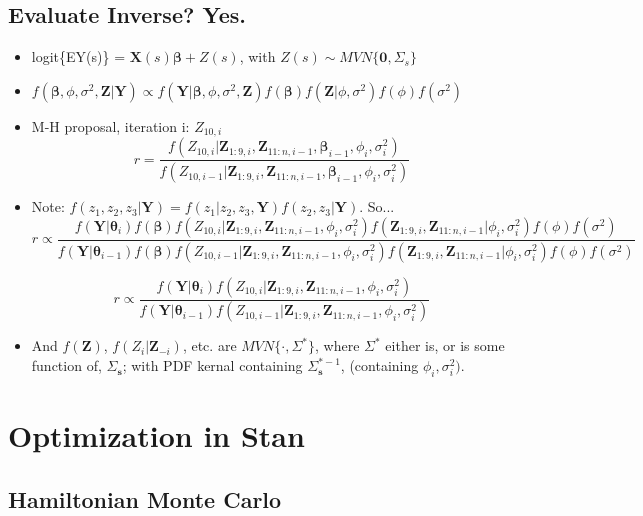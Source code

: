 \subsection{Evaluate Inverse? Yes.}


\begin{itemize}
\item logit\{EY(s)\} = $\pmb{X}(s)\pmb{\beta} + Z(s)$, with $Z(s) \sim MVN\{\pmb{0}, \Sigma_{s}\}$
\item $f(\pmb{\beta}, \phi, \sigma^{2}, \pmb{Z}|\pmb{Y}) \propto f(\pmb{Y}|\pmb{\beta}, \phi, \sigma^{2}, \pmb{Z})f(\pmb{\beta})f(\pmb{Z}|\phi, \sigma^{2})f(\phi)f(\sigma^{2})$
\item M-H proposal, iteration i: $Z_{10,i}$
$$ r = \frac{ f(Z_{10,i}|\pmb{Z}_{1:9,i},\pmb{Z}_{11:n,i-1}, \pmb{\beta}_{i-1}, \phi_{i}, \sigma^{2}_{i})}{f(Z_{10,i-1}|\pmb{Z}_{1:9,i},\pmb{Z}_{11:n,i-1}, \pmb{\beta}_{i-1}, \phi_{i}, \sigma^{2}_{i})} $$
 
\item Note: $f(z_{1}, z_{2}, z_{3}|\pmb{Y}) = f(z_{1}|z_{2},z_{3},\pmb{Y})f(z_{2},z_{3}|\pmb{Y})$. So... $$r \propto \frac{f(\pmb{Y}|\pmb{\theta}_{i})f(\pmb{\beta})f(Z_{10,i}|\pmb{Z}_{1:9,i},\pmb{Z}_{11:n,i-1}, \phi_{i}, \sigma^{2}_{i})f(\pmb{Z}_{1:9,i},\pmb{Z}_{11:n,i-1}|\phi_{i}, \sigma^{2}_{i})f(\phi)f(\sigma^{2})} {f(\pmb{Y}|\pmb{\theta}_{i-1})f(\pmb{\beta})f(Z_{10,i-1}|\pmb{Z}_{1:9,i},\pmb{Z}_{11:n,i-1}, \phi_{i}, \sigma^{2}_{i})f(\pmb{Z}_{1:9,i},\pmb{Z}_{11:n,i-1}|\phi_{i}, \sigma^{2}_{i})f(\phi)f(\sigma^{2})}$$

$$ r \propto \frac{f(\pmb{Y}|\pmb{\theta}_{i})f(Z_{10,i}|\pmb{Z}_{1:9,i},\pmb{Z}_{11:n,i-1}, \phi_{i}, \sigma^{2}_{i})}
{f(\pmb{Y}|\pmb{\theta}_{i-1})f(Z_{10,i-1}|\pmb{Z}_{1:9,i},\pmb{Z}_{11:n,i-1}, \phi_{i}, \sigma^{2}_{i})} $$

\item And $f(\pmb{Z})$, $f(Z_{i}|\pmb{Z}_{-i})$, etc. are $MVN\{\cdot,\Sigma^{*}\}$, where $\Sigma^{*}$ either is, or is some function of, $\Sigma_{\pmb{s}}$; with PDF kernal containing $\Sigma_{\pmb{s}}^{*-1}$, (containing $\phi_{i}, \sigma^{2}_{i})$.

\end{itemize}
        

\section{Optimization in Stan} %

\subsection{Hamiltonian Monte Carlo} %

